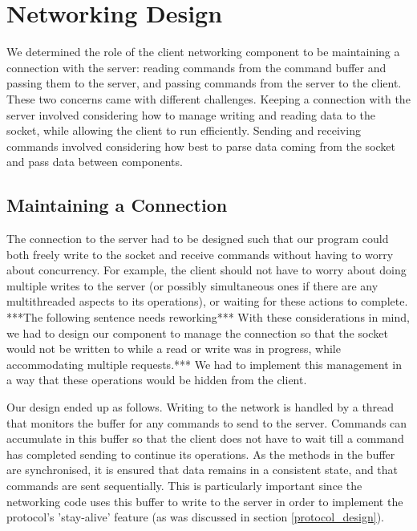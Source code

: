 \section{Networking Design}
\label{networking_design}

We determined the role of the client networking component to be maintaining a connection with the server: reading commands from the command buffer and passing them to the server, and passing commands from the server to the client. These two concerns came with different challenges. Keeping a connection with the server involved considering how to manage writing and reading data to the socket, while allowing the client to run efficiently. Sending and receiving commands involved considering how best to parse data coming from the socket and pass data between components.

\subsection {Maintaining a Connection}

The connection to the server had to be designed such that our program could both freely write to the socket and receive commands without having to worry about concurrency. For example, the client should not have to worry about doing multiple writes to the server (or possibly simultaneous ones if there are any multithreaded aspects to its operations), or waiting for these actions to complete. ***The following sentence needs reworking*** With these considerations in mind, we had to design our component to manage the connection so that the socket would not be written to while a read or write was in progress, while accommodating multiple requests.*** We had to implement this management in a way that these operations would be hidden from the client.

Our design ended up as follows. Writing to the network is handled by a thread that monitors the buffer for any commands to send to the server. Commands can accumulate in this buffer so that the client does not have to wait till a command has completed sending to continue its operations. As the methods in the buffer are synchronised, it is ensured that data remains in a consistent state, and that commands are sent sequentially. This is particularly important since the networking code uses this buffer to write to the server in order to implement the protocol's 'stay-alive' feature (as was discussed in section \ref{protocol_design}).


